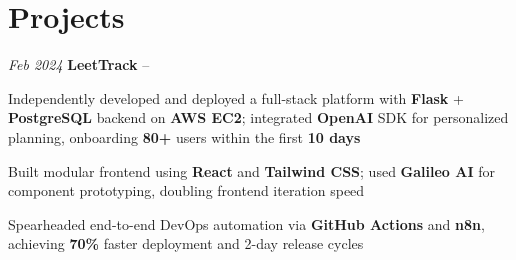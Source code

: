 \section{Projects}

\begin{twocolentry}{
    \textit{Feb 2024}
}{
    \textbf{LeetTrack} -- 
}
\end{twocolentry}
\begin{onecolentry}
    \begin{highlights}
        \item Independently developed and deployed a full-stack platform with \textbf{Flask} + \textbf{PostgreSQL} backend on \textbf{AWS EC2}; integrated \textbf{OpenAI} SDK for personalized planning, onboarding \textbf{80+} users within the first \textbf{10 days}
        \item Built modular frontend using \textbf{React} and \textbf{Tailwind CSS}; used \textbf{Galileo AI} for component prototyping, doubling frontend iteration speed
        \item Spearheaded end-to-end DevOps automation via \textbf{GitHub Actions} and \textbf{n8n}, achieving \textbf{70\%} faster deployment and 2-day release cycles
    \end{highlights}
\end{onecolentry}
